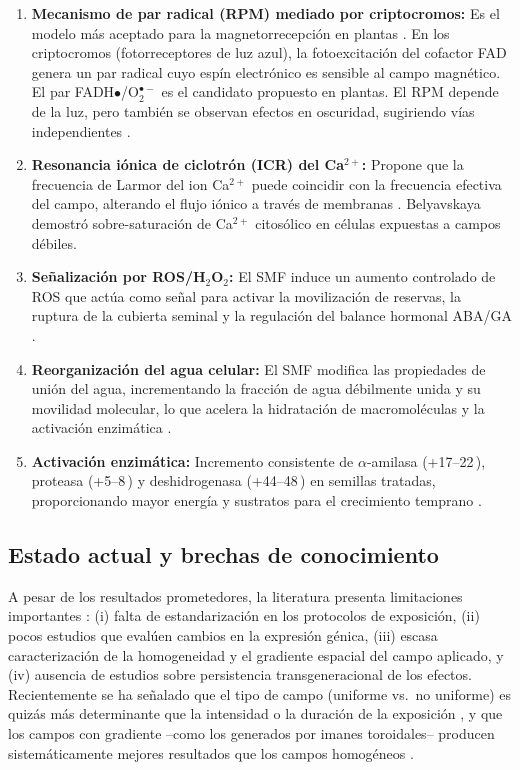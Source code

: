\begin{enumerate}
    \item \textbf{Mecanismo de par radical (RPM) mediado por criptocromos:} Es el modelo más aceptado para la magnetorrecepción en plantas \cite{maffei_2022, saletnik_2022_static}. En los criptocromos (fotorreceptores de luz azul), la fotoexcitación del cofactor FAD genera un par radical cuyo espín electrónico es sensible al campo magnético. El par FADH$\bullet$/O$_2^{\bullet-}$ es el candidato propuesto en plantas. El RPM depende de la luz, pero también se observan efectos en oscuridad, sugiriendo vías independientes \cite{maffei_2022}.
    \item \textbf{Resonancia iónica de ciclotrón (ICR) del Ca$^{2+}$:} Propone que la frecuencia de Larmor del ion Ca$^{2+}$ puede coincidir con la frecuencia efectiva del campo, alterando el flujo iónico a través de membranas \cite{radhakrishnan_2019, saletnik_2022_static}. Belyavskaya \cite{belyavskaya_2004} demostró sobre-saturación de Ca$^{2+}$ citosólico en células expuestas a campos débiles.
    \item \textbf{Señalización por ROS/H$_2$O$_2$:} El SMF induce un aumento controlado de ROS que actúa como señal para activar la movilización de reservas, la ruptura de la cubierta seminal y la regulación del balance hormonal ABA/GA \cite{shine_2017, kataria_2017, sarraf_2020}.
    \item \textbf{Reorganización del agua celular:} El SMF modifica las propiedades de unión del agua, incrementando la fracción de agua débilmente unida y su movilidad molecular, lo que acelera la hidratación de macromoléculas y la activación enzimática \cite{vashisth_nagarajan_2009, vashisth_nagarajan_2010, torres_socorro_2018}.
    \item \textbf{Activación enzimática:} Incremento consistente de $\alpha$-amilasa (+17--22\,\pct), proteasa (+5--8\,\pct) y deshidrogenasa (+44--48\,\pct) en semillas tratadas, proporcionando mayor energía y sustratos para el crecimiento temprano \cite{vashisth_nagarajan_2010, kataria_2017}.
\end{enumerate}

\subsection{Estado actual y brechas de conocimiento}

A pesar de los resultados prometedores, la literatura presenta limitaciones importantes \cite{araujo_2016, radhakrishnan_2019, sarraf_2020}: (i) falta de estandarización en los protocolos de exposición, (ii) pocos estudios que evalúen cambios en la expresión génica, (iii) escasa caracterización de la homogeneidad y el gradiente espacial del campo aplicado, y (iv) ausencia de estudios sobre persistencia transgeneracional de los efectos. Recientemente se ha señalado que el tipo de campo (uniforme vs.\ no uniforme) es quizás más determinante que la intensidad o la duración de la exposición \cite{tapia_belmonte_2023}, y que los campos con gradiente --como los generados por imanes toroidales-- producen sistemáticamente mejores resultados que los campos homogéneos \cite{torres_2019}.


